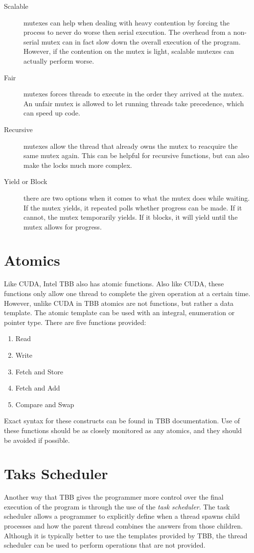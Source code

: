 \documentclass{article}
\newcommand{\comp}[1]{{\ttfamily #1}}
\begin{document}
  \begin{description}
  \item[Scalable] mutexes can help when dealing with heavy contention by forcing the process to never do worse then serial execution. The overhead from a non-serial mutex can in fact slow down the overall execution of the program. However, if the contention on the mutex is light, scalable mutexes can actually perform worse.
  \item[Fair] mutexes forces threads to execute in the order they arrived at the mutex. An unfair mutex is allowed to let running threads take precedence, which can speed up code.
  \item[Recursive] mutexes allow the thread that already owns the mutex to reacquire the same mutex again. This can be helpful for recursive functions, but can also make the locks much more complex.
  \item[Yield or Block] there are two options when it comes to what the mutex does while waiting. If the mutex yields, it repeated polls whether progress can be made. If it cannot, the mutex temporarily yields. If it blocks, it will yield until the mutex allows for progress.
  \end{description}

  \section{Atomics}
  Like CUDA, Intel TBB also has atomic functions. Also like CUDA, these functions only allow one thread to complete the given operation at a certain time. However, unlike CUDA in TBB atomics are not functions, but rather a data template. The \comp{atomic} template can be used with an integral, enumeration or pointer type. There are five functions provided:
  \begin{enumerate}
  \item Read
  \item Write
  \item Fetch and Store
  \item Fetch and Add
  \item Compare and Swap
  \end{enumerate}
  Exact syntax for these constructs can be found in TBB documentation. Use of these functions should be as closely monitored as any atomics, and they should be avoided if possible. 
  
  \section{Taks Scheduler}
  Another way that TBB gives the programmer more control over the final execution of the program is through the use of the \emph{task scheduler}. The task scheduler allows a programmer to explicitly define when a thread spawns child processes and how the parent thread combines the answers from those children. Although it is typically better to use the templates provided by TBB, the thread scheduler can be used to perform operations that are not provided.
\end{document}

